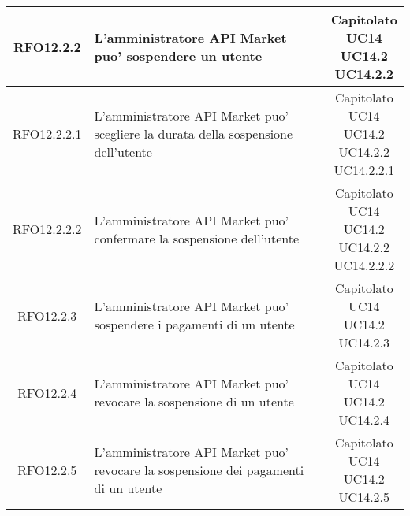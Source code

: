 \begin{longtable}{|c|p{8cm}|c|}
RFO12.2.2 &  L'amministratore API Market puo' sospendere un utente& \makecell*{Capitolato\\UC14\\UC14.2\\UC14.2.2} \\
\hline

RFO12.2.2.1 &  L'amministratore API Market puo' scegliere la durata della sospensione dell'utente& \makecell*{Capitolato\\UC14\\UC14.2\\UC14.2.2\\UC14.2.2.1} \\
\hline

RFO12.2.2.2 &  L'amministratore API Market puo' confermare la sospensione dell'utente& \makecell*{Capitolato\\UC14\\UC14.2\\UC14.2.2\\UC14.2.2.2} \\
\hline

RFO12.2.3 &  L'amministratore API Market puo' sospendere i pagamenti di un utente& \makecell*{Capitolato\\UC14\\UC14.2\\UC14.2.3} \\
\hline

RFO12.2.4 &  L'amministratore API Market puo' revocare la sospensione di un utente& \makecell*{Capitolato\\UC14\\UC14.2\\UC14.2.4} \\
\hline

RFO12.2.5 &  L'amministratore API Market puo' revocare la sospensione dei pagamenti di un utente& \makecell*{Capitolato\\UC14\\UC14.2\\UC14.2.5} \\
\hline















\end{longtable}

